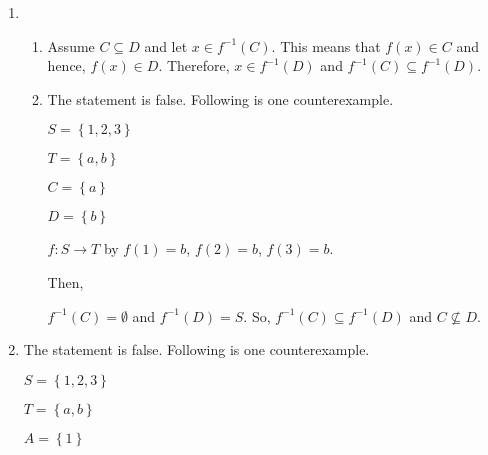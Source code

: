 \begin{enumerate}
\begin{enumerate}
\item The statement is false.  Following is one counterexample.
\begin{multicols}{4}
$S = \left\{ 1, 2, 3 \right\}$

$T = \left\{ a, b \right\}$

$A = \left\{ 1 \right\}$

$B = \left\{ 2, 3 \right\}$
\end{multicols}
$f: S \to T$ by $f \left( 1 \right) = a$, $f \left( 2 \right) = a$, $f \left( 3 \right) = b$.

Then,

$f \left( A \right) = \left\{a \right\}$ and $f \left( B \right) = \left\{ a, b \right\}$.  So, 
$f \left( A \right) \subseteq f \left( B \right)$ and $A \not \subseteq B$.
\end{enumerate}


\item \begin{enumerate}
\item Assume $C \subseteq D$ and let $x \in f^{-1} \left( C \right)$.  This means that 
$f \left( x \right) \in C$ and hence, $f \left( x \right) \in D$.  Therefore,  
$x \in f^{-1} \left( D \right)$ and $f^{-1} \left( C \right) \subseteq f^{-1} \left( D \right)$.

\item The statement is false.  Following is one counterexample.
\begin{multicols}{4}
$S = \left\{ 1, 2, 3 \right\}$

$T = \left\{ a, b \right\}$

$C = \left\{ a \right\}$

$D = \left\{ b \right\}$
\end{multicols}
$f: S \to T$ by $f \left( 1 \right) = b$, $f \left( 2 \right) = b$, $f \left( 3 \right) = b$.

Then,

$f^{-1} \left( C \right) = \emptyset$ and $f^{-1} \left( D \right) = S$.  So, 
$f^{-1} \left( C \right) \subseteq f^{-1} \left( D \right)$ and $C \not \subseteq D$.
\end{enumerate}

\item The statement is false.  Following is one counterexample.
\begin{multicols}{4}
$S = \left\{ 1, 2, 3 \right\}$

$T = \left\{ a, b \right\}$

$A = \left\{ 1 \right\}$


\end{multicols}
\end{enumerate}
